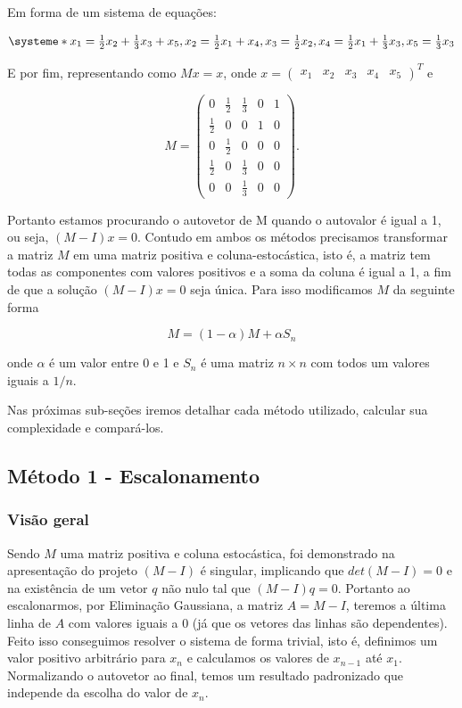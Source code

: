 \documentclass[12pt]{article}
\begin{document}
	Em forma de um sistema de equações:
	
		\[
			\systeme*{x_1 = \tfrac{1}{2}x_2 + \tfrac{1}{3}x_3 + x_5, x_2= \tfrac{1}{2}x_1 + x_4, x_3 = \tfrac{1}{2}x_2, x_4 = \tfrac{1}{2}x_1 + \tfrac{1}{3}x_3, x_5 = \tfrac{1}{3}x_3}
		\]
		
	 E por fim, representando como $Mx = x$, onde $x = \begin{pmatrix}x_1 & x_2 & x_3 & x_4 & x_5\end{pmatrix}^{T}$ e
	
		\[
			M = 
			\begin{pmatrix}
				0 & \tfrac{1}{2} & \tfrac{1}{3} & 0 & 1 \\
				\tfrac{1}{2} & 0 & 0 & 1 & 0 \\
				0 & \tfrac{1}{2} & 0 & 0 & 0 \\
				\tfrac{1}{2} & 0 & \tfrac{1}{3} & 0 & 0 \\
				0 & 0 & \tfrac{1}{3} & 0 & 0
			\end{pmatrix}.
		\]
	 
	Portanto estamos procurando o autovetor de M quando o autovalor é igual a 1, ou seja, $(M-I)x = 0$. Contudo em ambos os métodos precisamos transformar a matriz $M$ em uma matriz positiva e coluna-estocástica, isto é, a matriz tem todas as componentes com valores positivos e a soma da coluna é igual a 1, a fim de que a solução $(M-I)x = 0$ seja única. Para isso modificamos $M$ da seguinte forma
    	
    	\[
			M = (1-\alpha)M + \alpha S_n
		\]
    		
    	 	onde $\alpha$ é um valor entre 0 e 1 e $S_n$ é uma matriz $n\times n$ com todos um valores iguais a $1/n$.

	Nas próximas sub-seções iremos detalhar cada método utilizado, calcular sua complexidade e compará-los.
	 
	 \subsection{Método 1 - Escalonamento}
    	\subsubsection{Visão geral}
    		Sendo $M$ uma matriz positiva e coluna estocástica, foi demonstrado na apresentação do projeto $(M - I)$ é singular, implicando que $det(M-I) = 0$ e na existência de um vetor $q$ não nulo tal que $(M-I)q = 0$. Portanto ao escalonarmos, por Eliminação Gaussiana, a matriz $A = M - I$, teremos a última linha de $A$ com valores iguais a 0 (já que os vetores das linhas são dependentes). Feito isso conseguimos resolver o sistema de forma trivial, isto é, definimos um valor positivo arbitrário para $x_n$ e calculamos os valores de $x_{n-1}$ até $x_1$. Normalizando o autovetor ao final, temos um resultado padronizado que independe da escolha do valor de $x_n$.
    		
\end{document}
